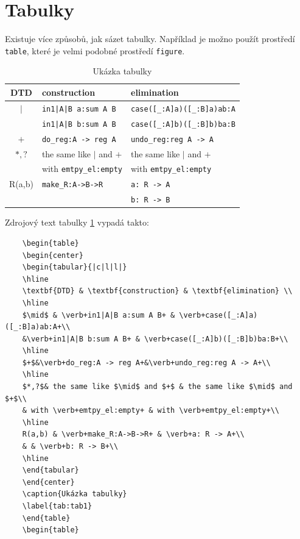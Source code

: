	\section{Tabulky}
	Existuje více způsobů, jak sázet tabulky. Například je možno použít prostředí \verb|table|, které je velmi podobné prostředí \verb|figure|. 
	
	\begin{table}
		\begin{center}
			\begin{tabular}{|c|l|l|}
				\hline
				\textbf{DTD} & \textbf{construction} & \textbf{elimination} \\
				\hline
				$\mid$ & \verb+in1|A|B a:sum A B+ & \verb+case([_:A]a)([_:B]a)ab:A+\\
				&\verb+in1|A|B b:sum A B+ & \verb+case([_:A]b)([_:B]b)ba:B+\\
				\hline
				$+$&\verb+do_reg:A -> reg A+&\verb+undo_reg:reg A -> A+\\
				\hline
				$*,?$& the same like $\mid$ and $+$ & the same like $\mid$ and $+$\\
				& with \verb+emtpy_el:empty+ & with \verb+emtpy_el:empty+\\
				\hline
				R(a,b) & \verb+make_R:A->B->R+ & \verb+a: R -> A+\\
				& & \verb+b: R -> B+\\
				\hline
			\end{tabular}
		\end{center}
		\caption{Ukázka tabulky}
		\label{tab:tab1}
	\end{table}
	
	Zdrojový text tabulky \ref{tab:tab1} vypadá takto:
	\begin{verbatim}
	\begin{table}
	\begin{center}
	\begin{tabular}{|c|l|l|}
	\hline
	\textbf{DTD} & \textbf{construction} & \textbf{elimination} \\
	\hline
	$\mid$ & \verb+in1|A|B a:sum A B+ & \verb+case([_:A]a)([_:B]a)ab:A+\\
	&\verb+in1|A|B b:sum A B+ & \verb+case([_:A]b)([_:B]b)ba:B+\\
	\hline
	$+$&\verb+do_reg:A -> reg A+&\verb+undo_reg:reg A -> A+\\
	\hline
	$*,?$& the same like $\mid$ and $+$ & the same like $\mid$ and $+$\\
	& with \verb+emtpy_el:empty+ & with \verb+emtpy_el:empty+\\
	\hline
	R(a,b) & \verb+make_R:A->B->R+ & \verb+a: R -> A+\\
	& & \verb+b: R -> B+\\
	\hline
	\end{tabular}
	\end{center}
	\caption{Ukázka tabulky}
	\label{tab:tab1}
	\end{table}
	\begin{table}
	\end{verbatim}
	
